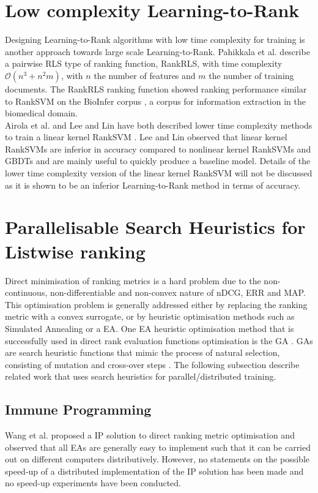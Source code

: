 \section{Low complexity Learning-to-Rank}
\label{sec:related_work_low_complexity}
Designing Learning-to-Rank algorithms with low time complexity for training is another approach towards large scale Learning-to-Rank. Pahikkala et al. \cite{Pahikkala2009} describe a pairwise \ac{RLS} type of ranking function, RankRLS, with time complexity $\mathcal{O}(n^3+n^2m)$, with $n$ the number of features and $m$ the number of training documents. The RankRLS ranking function showed ranking performance similar to RankSVM \cite{Herbrich1999, Joachims2002} on the BioInfer corpus \cite{Pyysalo2007}, a corpus for information extraction in the biomedical domain.\\

Airola et al. \cite{Airola2011} and Lee and Lin \cite{Lee2014} have both described lower time complexity methods to train a linear kernel RankSVM \cite{Herbrich1999, Joachims2002}. Lee and Lin \cite{Lee2014} observed that linear kernel RankSVMs are inferior in accuracy compared to nonlinear kernel RankSVMs and \ac{GBDT}s and are mainly useful to quickly produce a baseline model. Details of the lower time complexity version of the linear kernel RankSVM will not be discussed as it is shown to be an inferior Learning-to-Rank method in terms of accuracy.\\

\section{Parallelisable Search Heuristics for Listwise ranking}
Direct minimisation of ranking metrics is a hard problem due to the non-continuous, non-differentiable and non-convex nature of \ac{nDCG}, \ac{ERR} and \ac{MAP}. This optimisation problem is generally addressed either by replacing the ranking metric with a convex surrogate, or by heuristic optimisation methods such as Simulated Annealing or a \ac{EA}. One \ac{EA} heuristic optimisation method that is successfully used in direct rank evaluation functions optimisation is the \ac{GA} \cite{Yeh2007}. \ac{GA}s are search heuristic functions that mimic the process of natural selection, consisting of mutation and cross-over steps \cite{Holland1995}. The following subsection describe related work that uses search heuristics for parallel/distributed training.
\subsection{Immune Programming}
Wang et al. \cite{Wang2009b} proposed a \ac{IP} solution to direct ranking metric optimisation and observed that all \ac{EA}s are generally easy to implement such that it can be carried out on different computers distributively. However, no statements on the possible speed-up of a distributed implementation of the \ac{IP} solution has been made and no speed-up experiments have been conducted.
